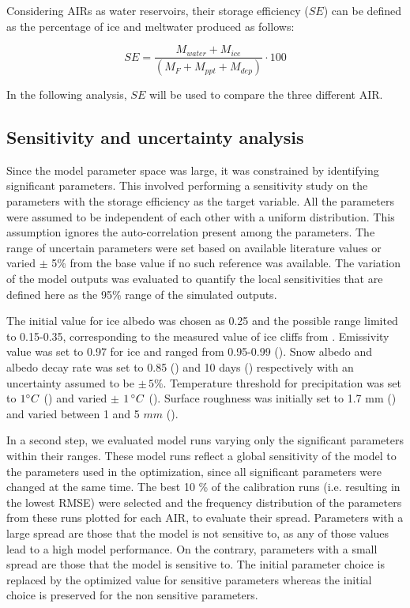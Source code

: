 \documentclass[utf8]{frontiersSCNS} %
\begin{document}
Considering AIRs as water reservoirs, their storage efficiency ($SE$) can be defined as the percentage of ice and
meltwater produced as follows:

\begin{equation} \textit{SE} = \frac{M_{water}+M_{ice}}{(M_F+M_{ppt}+M_{dep})} \cdot 100 \end{equation}

In the following analysis, $SE$ will be used to compare the three different AIR.

\subsection{Sensitivity and uncertainty analysis}
Since the model parameter space was large, it was constrained by identifying significant parameters. This involved
performing a sensitivity study on the parameters with the storage efficiency as the target variable.  All the parameters
were assumed to be independent of each other with a uniform distribution. This assumption ignores the auto-correlation
present among the parameters. The range of uncertain parameters were set based on available literature values or varied
$\pm$ 5\% from the base value if no such reference was available. The variation of the model outputs was evaluated to
quantify the local sensitivities that are defined here as the 95\% range of the simulated outputs.

The initial value for ice albedo was chosen as 0.25 and the possible range limited to 0.15-0.35, corresponding to the
measured value of ice cliffs from \cite{steiner_2015}. Emissivity value was set to 0.97 for ice and ranged from
0.95-0.99 (\cite{steiner_2015}). Snow albedo and albedo decay rate was set to 0.85 (\cite{CuffeyPaterson_2010}) and 10
days (\cite{Schmidt_2017}) respectively with an uncertainty assumed to be $\pm \,5 \%$. Temperature threshold for
precipitation was set to $1 \degree C$ (\cite{FujitaAgeta_2000}) and varied $\pm$ $1\,\degree C$ (\cite{Zhou_2010}).
Surface roughness was initially set to 1.7 mm (\cite{CuffeyPaterson_2010}) and varied between 1 and 5 $mm$
(\cite{BrockWillisSharp_2006}).

In a second step, we evaluated model runs varying only the significant parameters within their ranges. These model runs
reflect a global sensitivity of the model to the parameters used in the optimization, since all significant parameters
were changed at the same time.  The best 10 \% of the calibration runs (i.e. resulting in the lowest RMSE) were selected
and the frequency distribution of the parameters from these runs plotted for each AIR, to evaluate their spread.
Parameters with a large spread are those that the model is not sensitive to, as any of those values lead to a high model
performance. On the contrary, parameters with a small spread are those that the model is sensitive to. The initial
parameter choice is replaced by the optimized value for sensitive parameters whereas the initial choice is preserved for
the non sensitive parameters.
\end{document}
